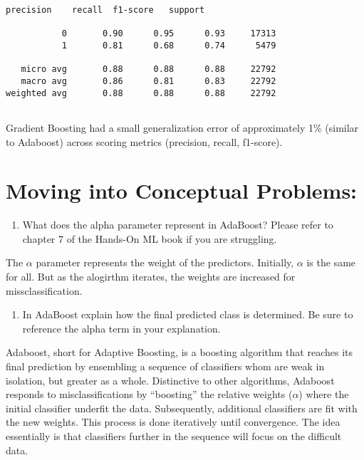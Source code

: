 \documentclass[11pt]{article}
\providecommand{\tightlist}{%
      \setlength{\itemsep}{0pt}\setlength{\parskip}{0pt}}
\begin{document}
    \begin{Verbatim}[commandchars=\\\{\}]
              precision    recall  f1-score   support

           0       0.90      0.95      0.93     17313
           1       0.81      0.68      0.74      5479

   micro avg       0.88      0.88      0.88     22792
   macro avg       0.86      0.81      0.83     22792
weighted avg       0.88      0.88      0.88     22792


    \end{Verbatim}

    Gradient Boosting had a small generalization error of approximately 1\%
(similar to Adaboost) across scoring metrics (precision, recall,
f1-score).

    \hypertarget{moving-into-conceptual-problems}{%
\section{Moving into Conceptual
Problems:}\label{moving-into-conceptual-problems}}

\begin{enumerate}
\def\labelenumi{\arabic{enumi})}
\setcounter{enumi}{4}
\tightlist
\item
  What does the alpha parameter represent in AdaBoost? Please refer to
  chapter 7 of the Hands-On ML book if you are struggling.
\end{enumerate}

The \(\alpha\) parameter represents the weight of the predictors.
Initially, \(\alpha\) is the same for all. But as the alogirthm
iterates, the weights are increased for missclassification.

\begin{enumerate}
\def\labelenumi{\arabic{enumi})}
\setcounter{enumi}{5}
\tightlist
\item
  In AdaBoost explain how the final predicted class is determined. Be
  sure to reference the alpha term in your explanation.
\end{enumerate}

Adaboost, short for Adaptive Boosting, is a boosting algorithm that
reaches its final prediction by ensembling a sequence of classifiers
whom are weak in isolation, but greater as a whole. Distinctive to other
algorithms, Adaboost responds to misclassifications by ``boosting'' the
relative weights (\(\alpha\)) where the initial classifier underfit the
data. Subsequently, additional classifiers are fit with the new weights.
This process is done iteratively until convergence. The idea essentially
is that classifiers further in the sequence will focus on the difficult
data.
\end{document}

